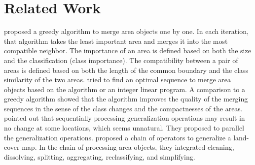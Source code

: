 \documentclass[ijgi,article,submit,moreauthors,pdftex]{Definitions/mdpi}
\begin{document}
 
\section{Related Work}
\label{sec:realted_work}

 proposed a greedy algorithm 
to merge area objects one by one.
In each iteration, that algorithm takes the least important area and 
merges it into the most compatible neighbor.
The importance of an area is defined 
based on both the size and the classification (class importance).
The compatibility between a pair of areas is defined based on 
both the length of the common boundary and the class similarity
of the two areas. 
\citet[]{Peng2019Thesis} tried to find an optimal sequence 
to merge area objects
based on the \Astar algorithm or an integer linear program.
A comparison to a greedy algorithm showed that 
the \Astar algorithm improves the quality of the merging sequences
in the sense of the class changes and the compactnesses of the areas.
 pointed out that 
sequentially processing generalization operations 
may result in no change at some locations, which seems unnatural.
They proposed to parallel the generalization operations.
\citet{Thiemann2018LandCover} proposed a chain of operators 
to generalize a land-cover map.
In the chain of processing area objects, 
they integrated cleaning, dissolving, splitting, aggregating, reclassifying, and simplifying. 
\end{document}

